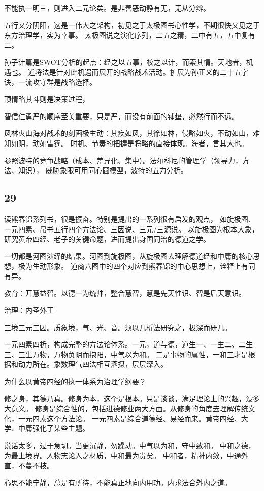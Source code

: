 不能执一明三，则进入二元论矣。是非善恶动静有无，无从分辨。

五行又分阴阳，这是一伟大之架构，初见之于太极图书心性学，不期很快又见之于东方治理学，实为幸事。
太极图说之演化序列，二五之精，二中有五，五中复有二。

孙子计篇是SWOT分析的起点：经之以五事，校之以计，而索其情。天地者，机遇也。
道将法是针对此机遇而展开的战略战术活动。扩展为孙正义的二十五字诀，一流攻守群是战略选择。

顶情略其斗则是决策过程，

智信仁勇严的顺序至关重要，只是严，而没有前面的铺垫，必然行而不远。

风林火山海对战术的刻画极生动：其疾如风，其徐如林，侵略如火，不动如山，难知如阴，动如雷霆。
时机、节奏的把握是将略的直接体现。海者，言其大也。

参照波特的竞争战略（成本、差异化、集中）。法尔科尼的管理学（领导力，方法、知识），
威胁象限可用同心圆模型，波特的五力分析。

\subsection{29}

读熊春锦系列书，很是振奋。特别是提出的一系列很有启发的观点，
如旋极图、一元四素、帛书五行四个方法论、三因说、三元/三源说。
以旋极图为根本大象，研究黄帝四经、老子的关键命题，进而提出身国同治的德道之学。

一切都是河图演绎的结果。河图到旋极图，从旋极图去理解德道经和中庸的核心思想，极为生动形象。
道商六图中的四个对应到熊春锦的中心思想上，诠释上有同有异。

教育：开慧益智。以德一为统帅，整合慧智，慧是先天性识、智是后天意识。

治理：内圣外王

三境三元三因。质象境，气、光、音。须以几析法研究之，极深而研几。

一元四素四析，构成完整的方法论体系。一元，道与德，道生一、一生二、二生三、三生万物，万物负阴而抱阳，中气以为和。
二是事物的属性，一和三才是根据和动力所在。象数理气四法相互涵摄，层层深入。

为什么以黄帝四经的执一体系为治理学纲要？

修之身，其德乃真。修身为本，这个是根本。只是谈谈，满足理论上的兴趣，没多大意义。
修身是综合性的，包括进德修业两大方面。从修身的角度去理解传统文化，一元四素这个方法论。
一元四素是综合道德经、易经而来。黄帝四经、大学、中庸强化了某些主题。

说话太多，过于急切。当更沉静，勿躁动。中气以为和，守中致和。
中和之德，为最上境界。人物志论人之材质，中和最为贵矣。
中和者，精神内敛，中通外直，不蔓不枝。

心思不能宁静，总是有所待，不能真正地向内用功。内求法合外内之道。

